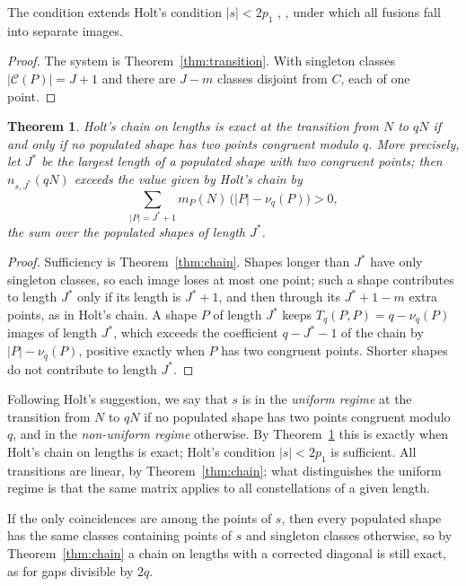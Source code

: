 \documentclass[11pt]{article}
\newtheorem{theorem}{Theorem}[section]
\theoremstyle{definition}
\theoremstyle{remark}
\newcommand{\C}{\mathcal{C}}
\begin{document}
The condition extends Holt's condition $|s| < 2p_1$ \cite[\S5]{Ho25}, \cite[Lemma~2.4]{Ho26}, under which all fusions fall into separate images.

\begin{proof}
The system is Theorem~\ref{thm:transition}. With singleton classes $|\C(P)| = J + 1$ and there are $J - m$ classes disjoint from $C$, each of one point.
\end{proof}

\begin{theorem}\label{thm:chainiff}
Holt's chain on lengths is exact at the transition from $N$ to $qN$ if and only if no populated shape has two points congruent modulo $q$. More precisely, let $J^*$ be the largest length of a populated shape with two congruent points; then $n_{s,J^*}(qN)$ exceeds the value given by Holt's chain by
\[
  \sum_{|P| = J^* + 1} m_P(N)\, \big( |P| - \nu_q(P) \big) > 0,
\]
the sum over the populated shapes of length $J^*$.
\end{theorem}

\begin{proof}
Sufficiency is Theorem~\ref{thm:chain}. Shapes longer than $J^*$ have only singleton classes, so each image loses at most one point; such a shape contributes to length $J^*$ only if its length is $J^* + 1$, and then through its $J^* + 1 - m$ extra points, as in Holt's chain. A shape $P$ of length $J^*$ keeps $T_q(P, P) = q - \nu_q(P)$ images of length $J^*$, which exceeds the coefficient $q - J^* - 1$ of the chain by $|P| - \nu_q(P)$, positive exactly when $P$ has two congruent points. Shorter shapes do not contribute to length $J^*$.
\end{proof}

Following Holt's suggestion, we say that $s$ is in the \emph{uniform regime} at the transition from $N$ to $qN$ if no populated shape has two points congruent modulo $q$, and in the \emph{non-uniform regime} otherwise. By Theorem~\ref{thm:chainiff} this is exactly when Holt's chain on lengths is exact; Holt's condition $|s| < 2p_1$ is sufficient. All transitions are linear, by Theorem~\ref{thm:chain}; what distinguishes the uniform regime is that the same matrix applies to all constellations of a given length.

If the only coincidences are among the points of $s$, then every populated shape has the same classes containing points of $s$ and singleton classes otherwise, so by Theorem~\ref{thm:chain} a chain on lengths with a corrected diagonal is still exact, as for gaps divisible by $2q$.
\end{document}
